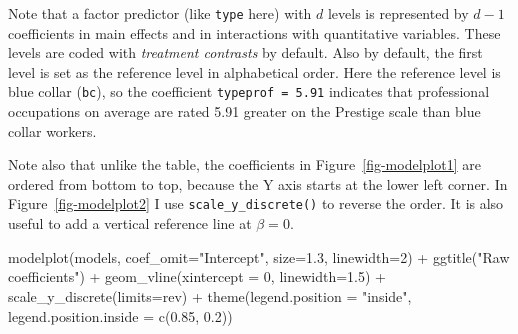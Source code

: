 \documentclass[
  letterpaper,
  10pt,
  krantz2]{krantz}
\makeatletter
\newenvironment{Shaded}{\begin{snugshade}}{\end{snugshade}}
\newcommand{\AttributeTok}[1]{\textcolor[rgb]{0.40,0.45,0.13}{#1}}
\newcommand{\DecValTok}[1]{\textcolor[rgb]{0.68,0.00,0.00}{#1}}
\newcommand{\FloatTok}[1]{\textcolor[rgb]{0.68,0.00,0.00}{#1}}
\newcommand{\FunctionTok}[1]{\textcolor[rgb]{0.28,0.35,0.67}{#1}}
\newcommand{\NormalTok}[1]{\textcolor[rgb]{0.00,0.23,0.31}{#1}}
\newcommand{\SpecialCharTok}[1]{\textcolor[rgb]{0.37,0.37,0.37}{#1}}
\newcommand{\StringTok}[1]{\textcolor[rgb]{0.13,0.47,0.30}{#1}}
\newenvironment{kframe}{%
  \medskip{}
  \setlength{\fboxsep}{.8em}
  \def\at@end@of@kframe{}%
  \ifinner\ifhmode%
  \def\at@end@of@kframe{\end{minipage}}%
  \begin{minipage}{\columnwidth}%
  \fi\fi%
  \def\FrameCommand##1{\hskip\@totalleftmargin \hskip-\fboxsep
  \colorbox{shadecolor}{##1}\hskip-\fboxsep
      \hskip-\linewidth \hskip-\@totalleftmargin \hskip\columnwidth}%
  \MakeFramed {\advance\hsize-\width
    \@totalleftmargin\z@ \linewidth\hsize
    \@setminipage}}%
{\par\unskip\endMakeFramed%
  \at@end@of@kframe}
\renewenvironment{Shaded}{\begin{kframe}}{\end{kframe}}
\makeatother
\begin{document}
Note that a factor predictor (like \texttt{type} here) with \(d\) levels
is represented by \(d-1\) coefficients in main effects and in
interactions with quantitative variables. These levels are coded with
\emph{treatment contrasts} by default. Also by default, the first level
is set as the reference level in alphabetical order. Here the reference
level is blue collar (\texttt{bc}), so the coefficient
\texttt{typeprof\ =\ 5.91} indicates that professional occupations on
average are rated 5.91 greater on the Prestige scale than blue collar
workers.

Note also that unlike the table, the coefficients in
Figure~\ref{fig-modelplot1} are ordered from bottom to top, because the
Y axis starts at the lower left corner. In Figure~\ref{fig-modelplot2} I
use \texttt{scale\_y\_discrete()} to reverse the order. It is also
useful to add a vertical reference line at \(\beta = 0\).

\begin{Shaded}
\begin{Highlighting}[]
\FunctionTok{modelplot}\NormalTok{(models, }
          \AttributeTok{coef\_omit=}\StringTok{"Intercept"}\NormalTok{, }
          \AttributeTok{size=}\FloatTok{1.3}\NormalTok{, }\AttributeTok{linewidth=}\DecValTok{2}\NormalTok{) }\SpecialCharTok{+}
  \FunctionTok{ggtitle}\NormalTok{(}\StringTok{"Raw coefficients"}\NormalTok{) }\SpecialCharTok{+}
  \FunctionTok{geom\_vline}\NormalTok{(}\AttributeTok{xintercept =} \DecValTok{0}\NormalTok{, }\AttributeTok{linewidth=}\FloatTok{1.5}\NormalTok{) }\SpecialCharTok{+}
  \FunctionTok{scale\_y\_discrete}\NormalTok{(}\AttributeTok{limits=}\NormalTok{rev) }\SpecialCharTok{+}
  \FunctionTok{theme}\NormalTok{(}\AttributeTok{legend.position =} \StringTok{"inside"}\NormalTok{,}
        \AttributeTok{legend.position.inside =} \FunctionTok{c}\NormalTok{(}\FloatTok{0.85}\NormalTok{, }\FloatTok{0.2}\NormalTok{))}
\end{Highlighting}
\end{Shaded}
\end{document}
